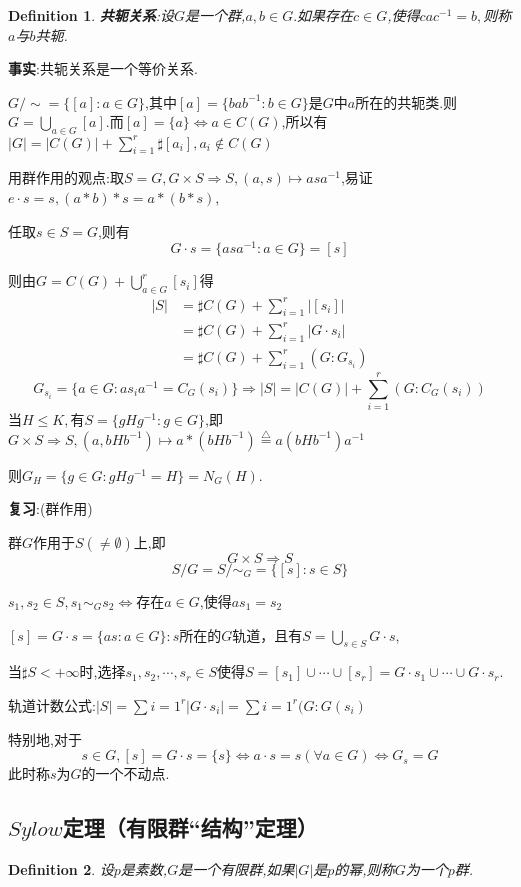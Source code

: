 \documentclass[UTF8]{article}
\newtheorem{defn}{Definition}[section]
\begin{document}
\begin{defn}
	\textbf{共轭关系}:设$G$是一个群,$a,b\in G.$如果存在$c\in G$,使得$cac^{-1}=b,$则称$a$与$b$共轭.
\end{defn}

\textbf{事实}:共轭关系是一个等价关系.

$G/\sim=\{[a]:a\in G\}$,其中$[a]=\{bab^{-1}:b\in G\}$是$G$中$a$所在的共轭类.则$G=\bigcup_{a\in G}[a].$而$[a]=\{a\}\Leftrightarrow a\in C(G)$,所以有$|G|=|C(G)|+\sum_{i=1}^r \sharp[a_i],a_i\notin C(G)$

用群作用的观点:取$S=G,G\times S\Rightarrow S,(a,s)\mapsto asa^{-1}$,易证$e\cdot s=s,(a\ast b)\ast s=a\ast (b\ast s)$,

任取$s\in S=G$,则有
$$G\cdot s=\{asa^{-1}:a\in G\}=[s]$$

则由$G=C(G)+\bigcup_{a\in G}^r [s_i]$得
\[
\begin{split}
|S|&=\sharp C(G)+\sum_{i=1}^r|[s_i]|\\
&=\sharp C(G)+\sum_{i=1}^r|G\cdot s_i|\\
&=\sharp C(G)+\sum_{i=1}^r(G: G_{s_i})
\end{split}
\]
$$G_{s_i}=\{a\in G:as_ia^{-1}=C_G(s_i)\}\Rightarrow|S|= |C(G)|+\sum_{i=1}^r(G: C_G(s_i))$$
当$H\le K,$有$S=\{gHg^{-1}:g\in G\}$,即$G\times S\Rightarrow S,(a,bHb^{-1})\mapsto a\ast(bHb^{-1})\stackrel{\bigtriangleup}{=}a(bHb^{-1})a^{-1}$

则$G_H=\{g\in G:gHg^{-1}=H\}=N_G(H).$

\textbf{复习}:(群作用)

群$G$作用于$S(\ne\emptyset)$上,即
$$G\times S\Rightarrow S$$
$$S/G=S/{\sim_G}=\{[s]:s\in S\}$$
\begin{center}
	$s_1,s_2\in S,s_1\sim_G s_2\Leftrightarrow$存在$a\in G$,使得$as_1=s_2$
\end{center}

$[s]=G\cdot s=\{as:a\in G\}:s$所在的$G$轨道，且有$S=\bigcup_{s\in S}G\cdot s,$

当$\sharp S<+\infty$时,选择$s_1,s_2,\cdots,s_r\in S$使得$S=[s_1]\cup\cdots\cup[s_r]=G\cdot s_1\cup\cdots\cup G\cdot s_r.$

轨道计数公式:$|S|=\sum{i=1}^r|G\cdot s_i|=\sum{i=1}^r(G: G{(s_i)}$

特别地,对于$$s\in G,[s]=G\cdot s=\{s\}\Leftrightarrow a\cdot s=s(\forall a\in G)\Leftrightarrow G_s=G$$
此时称$s$为$G$的一个不动点.



\subsection{$Sylow$定理（有限群“结构”定理）}
\normalsize
\begin{defn}
	设$p$是素数,$G$是一个有限群,如果$|G|$是$p$的幂,则称$G$为一个$p$群.
\end{defn}
\end{document}
